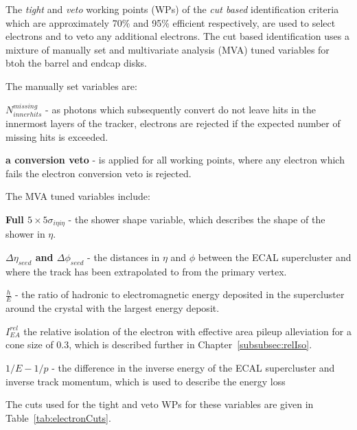 The \emph{tight} and \emph{veto} working points (WPs) of the \emph{cut based} identification criteria which are approximately  70\% and 95\% efficient respectively, are used to select electrons and to veto any additional electrons.
The cut based identification uses a mixture of manually set and multivariate analysis (MVA) tuned variables for btoh the barrel and endcap disks.

The manually set variables are:
\item \textbf{$N^{missing}_{inner hits}$} - as photons which subsequently convert do not leave hits in the innermost layers of the tracker, electrons are rejected if the expected number of missing hits is exceeded.
\item \textbf{a conversion veto} - is applied for all working points, where any electron which fails the electron conversion veto is rejected.

The MVA tuned variables include:
\item \textbf{Full $5 \times 5 \sigma_{i\eta i\eta}$} - the shower shape variable, which describes the shape of the shower in $\eta$.
\item \textbf{$\Delta \eta_{seed}$ and $\Delta \phi_{seed}$} - the distances in $\eta$ and $\phi$ between the ECAL supercluster and where the track has been extrapolated to from the primary vertex.
\item \textbf{$\frac{h}{E}$} - the ratio of hadronic to electromagnetic energy deposited in the supercluster around the crystal with the largest energy deposit.
\item \textbf{$I^{rel}_{EA}$} the relative isolation of the electron with effective area pileup alleviation for a cone size of 0.3, which is described further in Chapter~\ref{subsubsec:relIso}.
\item \textbf{$1/E - 1/p$} - the difference in the inverse energy of the ECAL supercluster and inverse track momentum, which is used to describe the energy loss 

The cuts used for the tight and veto WPs for these variables are given in Table~\ref{tab:electronCuts}.

